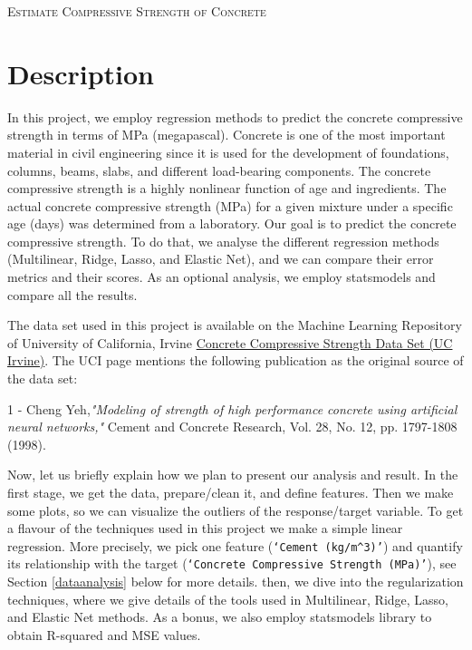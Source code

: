\documentclass[a4paper,11pt]{amsart}
\begin{document}
\begin{tcolorbox}[center,colback=white]
\begin{center}
{\large\textsc{Estimate Compressive Strength of Concrete}}\\
\end{center}
\end{tcolorbox}

\section{Description}

In this project, we employ regression methods to predict the concrete compressive strength in terms of MPa (megapascal). Concrete is one of the most important material in civil engineering since it is used for the development of foundations, columns, beams, slabs, and different load-bearing components. The concrete compressive strength is a highly nonlinear function of age and ingredients. The actual concrete compressive strength (MPa) for a given mixture under a specific age (days) was determined from a laboratory. Our goal is to predict the concrete compressive strength. To do that, we analyse the different regression methods (Multilinear, Ridge, Lasso, and Elastic Net), and we can compare their error metrics and their scores. As an optional analysis, we employ statsmodels and compare all the results. 

\medbreak 

The data set used in this project is available on the Machine Learning Repository of University of California, Irvine \href{https://archive.ics.uci.edu/ml/datasets/Concrete+Compressive+Strength}{Concrete Compressive Strength Data Set (UC Irvine)}. The UCI page mentions the following publication as the original source of the data set:

\medbreak

\begin{flushleft}
1 - Cheng Yeh,\emph{"Modeling of strength of high performance concrete using artificial neural networks,"} Cement and Concrete Research, Vol. 28, No. 12, pp. 1797-1808 (1998).
\end{flushleft}

\medbreak

Now, let us briefly explain how we plan to present our analysis and result. In the first stage, we get the data, prepare/clean it, and define features. Then we make some plots, so we can visualize the outliers of the response/target variable. To get a flavour of the techniques used in this project we make a simple linear regression. More precisely, we pick one feature (\texttt{`Cement (kg/$m^3$)'}) and quantify its relationship with the target (\texttt{`Concrete Compressive Strength (MPa)'}), see Section \ref{dataanalysis} below for more details. then, we dive into the regularization techniques, where we give details of the tools used in Multilinear, Ridge, Lasso, and Elastic Net methods. As a bonus, we also employ statsmodels library to obtain R-squared and MSE values.
\end{document}
